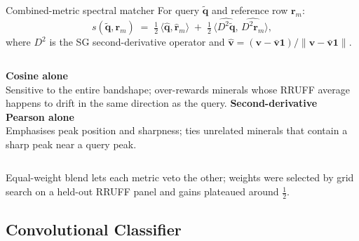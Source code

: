 \documentclass[10pt,aspectratio=169,xcolor=dvipsnames]{beamer}
\begin{document}
\begin{frame}{Combined-metric spectral matcher}
  For query $\tilde{\mathbf{q}}$ and reference row $\mathbf{r}_m$:
  \[
    s(\tilde{\mathbf{q}}, \mathbf{r}_m) \;=\;
      \tfrac{1}{2}\,\langle \hat{\mathbf{q}}, \hat{\mathbf{r}}_m \rangle
      \;+\;
      \tfrac{1}{2}\,\langle \widehat{D^{2}\!\tilde{\mathbf{q}}},\,
                         \widehat{D^{2}\!\mathbf{r}_m} \rangle ,
  \]
  where $D^{2}$ is the SG second-derivative operator and
  $\hat{\mathbf{v}} = (\mathbf{v} - \bar{\mathbf{v}}\mathbf{1}) /
                       \lVert \mathbf{v} - \bar{\mathbf{v}}\mathbf{1} \rVert$.
  \medskip

  \begin{columns}[T,onlytextwidth]
      \textbf{Cosine alone}\\
      Sensitive to the entire bandshape; over-rewards minerals whose RRUFF
      average happens to drift in the same direction as the query.
      \textbf{Second-derivative Pearson alone}\\
      Emphasises peak position and sharpness; ties unrelated minerals that
      contain a sharp peak near a query peak.
  \end{columns}
  \bigskip
  Equal-weight blend lets each metric \alert{veto} the other; weights were
  selected by grid search on a held-out RRUFF panel and gains plateaued
  around $\tfrac{1}{2}$.
\end{frame}

\subsection{Convolutional Classifier}
\end{document}
